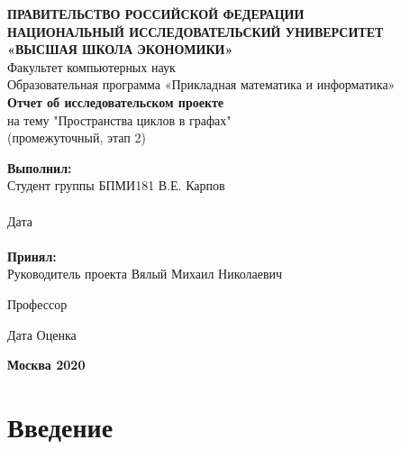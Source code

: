 \documentclass[a4paper]{article}
\theoremstyle{definition}
\begin{document}
\begin{center}
    \textbf{ПРАВИТЕЛЬСТВО РОССИЙСКОЙ ФЕДЕРАЦИИ} \\
    \textbf{НАЦИОНАЛЬНЫЙ ИССЛЕДОВАТЕЛЬСКИЙ УНИВЕРСИТЕТ} \\
    \textbf{«ВЫСШАЯ ШКОЛА ЭКОНОМИКИ»} \\
    \hfill\break
    \normalsize{Факультет компьютерных наук} \\
    Образовательная программа «Прикладная математика и информатика» \\
    \vspace{4.2cm}
    \textbf{Отчет об исследовательском проекте} \\
    \hfill\break
    на тему "Пространства циклов в графах" \\
    \hfill\break
    (промежуточный, этап 2)
\end{center}
\vspace{3cm}
\textbf{Выполнил:} \\
Студент группы БПМИ181 \hfill \underline{\hspace{5cm}} \hfill В.Е. Карпов \\
\vspace{0.1cm} \\
\hspace*{\fill} Дата \;\underline{\hspace{4cm}} \\
\vspace{0.1cm} \\
\textbf{Принял:} \\
Руководитель проекта \hfill Вялый Михаил Николаевич
\begin{flushright}
    Профессор
\end{flushright}
\vspace{0.5cm}
Дата \;\underline{\hspace{4cm}} \hfill
Оценка \quad \underline{\hspace{1.5cm}} \hfill
\underline{\hspace{5cm}} \\
\vfill
\begin{center}
    \textbf{Москва 2020}
\end{center}
\thispagestyle{empty}

\newpage

\tableofcontents

\newpage

\section{Введение}
\end{document}
